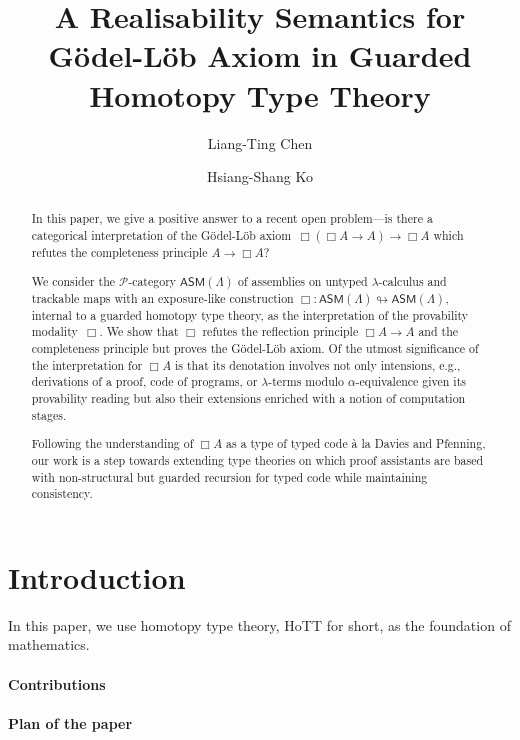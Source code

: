 \documentclass[a4paper,UKenglish,numberwithinsect,cleveref,thm-restate]{lipics-v2021}
\title{A Realisability Semantics for Gödel-Löb Axiom in Guarded Homotopy Type Theory}
\author{Liang-Ting Chen}%
  {Institute of Information Science, Academia Sinica, Taiwan~\url{https://l-tchen.github.io}}%
  {liang.ting.chen.tw@gmail.com}%
  {https://orcid.org/0000-0002-3250-1331}{}
\author{Hsiang-Shang Ko}%
  {Institute of Information Science, Academia Sinica, Taiwan~\url{https://josh-hs-ko.github.io}}%
  {joshko@iis.sinica.edu.tw}%
  {https://orcid.org/0000-0002-2439-1048}{}
\numberwithin{equation}{section}
\newcommand{\PP}{\mathscr{P}}
\newcommand{\ASM}{\mathsf{ASM}}
\theoremstyle{plain}
\begin{document}
\maketitle

\begin{abstract}
  In this paper, we give a positive answer to a recent open problem---is there a categorical interpretation of the Gödel-Löb axiom~$\Box (\Box A \to A) \to \Box A$ which refutes the completeness principle $A \to \Box A$?

  We consider the $\PP$-category $\ASM(\Lambda)$ of assemblies on untyped $\lambda$-calculus and trackable maps with an exposure-like construction $\Box\colon \ASM(\Lambda) \looparrowright \ASM(\Lambda)$, internal to a guarded homotopy type theory, as the interpretation of the provability modality~$\Box$.
  We show that $\Box$ refutes the reflection principle $\Box A \to A$ and the completeness principle but proves the Gödel-Löb axiom.
  Of the utmost significance of the interpretation for $\Box A$ is that its denotation involves not only intensions, e.g., derivations of a proof, code of programs, or $\lambda$-terms modulo $\alpha$-equivalence given its provability reading but also their extensions enriched with a notion of computation stages. 

  Following the understanding of $\Box A$ as a type of typed code \`a la Davies and Pfenning, our work is a step towards extending type theories on which proof assistants are based with non-structural but guarded recursion for typed code while maintaining consistency.
\end{abstract}

\section{Introduction}\label{sec:intro}
\cite{Litak2014,Davies2001b}

In this paper, we use homotopy type theory, HoTT for short, as the foundation of mathematics. 
\paragraph*{Contributions}

\paragraph*{Plan of the paper}
\end{document}
